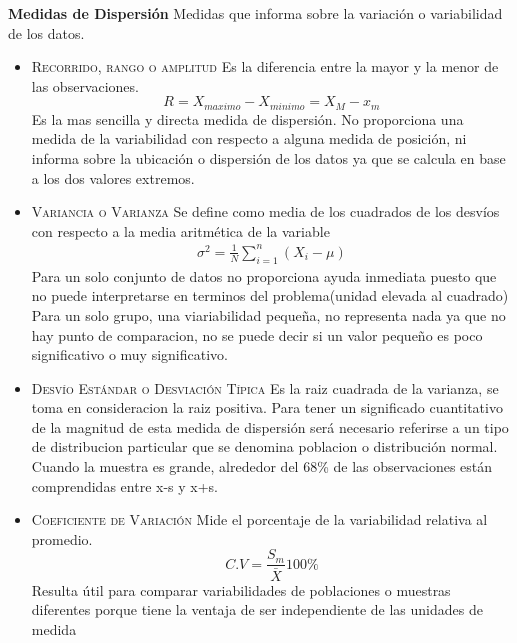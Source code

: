 \documentclass[10pt,a4paper]{article}
\begin{document}
\textbf{Medidas de Dispersión}
Medidas que informa sobre la variación o variabilidad de los datos.
\begin{itemize}
	\item \textsc{Recorrido, rango o amplitud} Es la diferencia entre la mayor y la menor de las observaciones.
	\begin{equation}
		R=X_{maximo}-X_{minimo}=X_M-x_m
	\end{equation}
	Es la mas sencilla y directa medida de dispersión. No proporciona una medida de la variabilidad con respecto a alguna medida de posición, ni informa sobre la ubicación o dispersión de los datos ya que se calcula en base a los dos valores extremos.
	\item \textsc{Variancia o Varianza} Se define como media de los cuadrados de los desvíos con respecto a la media aritmética de la variable
	\begin{align}
		\sigma^2=\frac{1}{N}\sum_{i=1}^{n}\left(X_i-\mu\right)
	\end{align}
	Para un solo conjunto de datos no proporciona ayuda inmediata puesto que no puede interpretarse en terminos del problema(unidad elevada al cuadrado)
	Para un solo grupo, una viariabilidad pequeña, no representa nada ya que no hay punto de comparacion, no se puede decir si un valor pequeño es poco significativo o muy significativo.
	\item \textsc{Desvío Estándar o Desviación Típica}
	Es la raiz cuadrada de la varianza, se toma en consideracion la raiz positiva. Para tener un significado cuantitativo de la magnitud de esta medida de dispersión será necesario referirse a un tipo de distribucion particular que se denomina poblacion o distribución normal.
	Cuando la muestra es grande, alrededor del 68\% de las observaciones están comprendidas entre x-s y x+s.
	\item \textsc{Coeficiente de Variación} Mide el porcentaje de la variabilidad relativa al promedio.
	\begin{equation}
		C.V=\frac{S_m}{\bar{X}}100\%
	\end{equation}
	Resulta útil para comparar variabilidades de poblaciones o muestras diferentes porque tiene la ventaja de ser independiente de las unidades de medida
\end{itemize}
\end{document}
